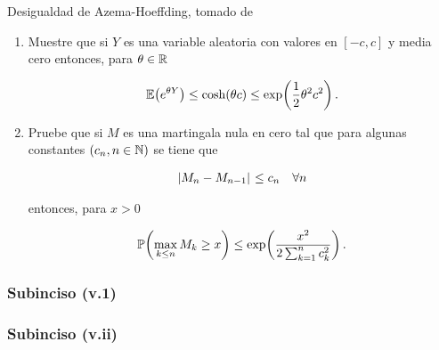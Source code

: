 Desigualdad de Azema-Hoeffding, tomado de \cite[E14.2, p.237]{MR1155402}
\begin{enumerate}
    \item[(v.i)]    [\ref{problema2_3:subinciso5_1}]
         Muestre que si $Y$ es una variable aleatoria con valores en $[-c,c]$ y media cero entonces, para $\theta\in\mathbb{R}$
        
        \begin{align}
            \mathbb{E}\! \left( e^{\theta Y} \right)\leq\cosh\!\left( \theta c\right) \leq \exp\!\left( \frac{1}{2}\theta^2c^2\right) . 
        \end{align}\par\null

    \item[(v.ii)]    [\ref{problema2_3:subinciso5_2}]
        Pruebe que si $M$ es una martingala nula en cero tal que para algunas constantes $\left( c_n,n\in\mathbb{N}\right) $ se tiene que
        
        \begin{align}
            \hspace{.25mm}\left|M_n-M_{n-1}\right|\hspace{.25mm}\leq c_n\quad\forall n
        \end{align}
        
        entonces, para $x>0$
        
        \begin{align}
            \mathbb{P}\! \left( \max_{k\leq n} M_k\geq x \right)\leq \exp\!\left( \frac{x^2}{2\sum_{k=1}^n c_k^2}\right) .
        \end{align}
\end{enumerate}
    
\subsubsection{Subinciso (v.1)}     \label{problema2_3:subinciso5_1}
    
    \newpage
    
\subsubsection{Subinciso (v.ii)}    \label{problema2_3:subinciso5_2} 
    

